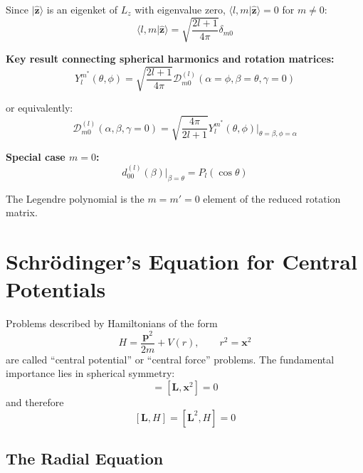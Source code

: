\documentclass[11pt,a4paper]{article}
\begin{document}
Since $|\hat{\mathbf{z}}\rangle$ is an eigenket of $L_z$ with eigenvalue zero, $\langle l, m|\hat{\mathbf{z}}\rangle = 0$ for $m \neq 0$:
\begin{equation}
\langle l, m|\hat{\mathbf{z}}\rangle = \sqrt{\frac{2l+1}{4\pi}}\delta_{m0}
\tag{3.259}
\end{equation}

\textbf{Key result connecting spherical harmonics and rotation matrices:}
\begin{equation}
\boxed{Y_l^{m^*}(\theta, \phi) = \sqrt{\frac{2l+1}{4\pi}}\mathscr{D}_{m0}^{(l)}(\alpha = \phi, \beta = \theta, \gamma = 0)}
\tag{3.260}
\end{equation}

or equivalently:
\begin{equation}
\mathscr{D}_{m0}^{(l)}(\alpha, \beta, \gamma = 0) = \sqrt{\frac{4\pi}{2l+1}}Y_l^{m^*}(\theta, \phi)\bigg|_{\theta = \beta, \phi = \alpha}
\tag{3.261}
\end{equation}

\textbf{Special case $m = 0$:}
\begin{equation}
\boxed{d_{00}^{(l)}(\beta)\big|_{\beta = \theta} = P_l(\cos\theta)}
\tag{3.262}
\end{equation}

The Legendre polynomial is the $m = m' = 0$ element of the reduced rotation matrix.

\section{Schrödinger's Equation for Central Potentials}

Problems described by Hamiltonians of the form
\begin{equation}
H = \frac{\mathbf{p}^2}{2m} + V(r), \qquad r^2 = \mathbf{x}^2
\tag{3.263}
\end{equation}
are called ``central potential'' or ``central force'' problems. The fundamental importance lies in spherical symmetry:
\begin{equation}
[\mathbf{L}, \mathbf{p}^2] = [\mathbf{L}, \mathbf{x}^2] = 0
\tag{3.264}
\end{equation}
and therefore
\begin{equation}
\boxed{[\mathbf{L}, H] = [\mathbf{L}^2, H] = 0}
\tag{3.265}
\end{equation}

\subsection{The Radial Equation}
\end{document}
